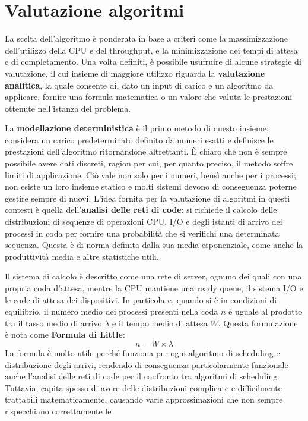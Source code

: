 \section{Valutazione algoritmi}
La scelta dell'algoritmo è ponderata in base a criteri come la massimizzazione dell'utilizzo della CPU e del throughput, e la minimizzazione dei tempi
di attesa e di completamento. Una volta definiti, è possibile usufruire di alcune strategie di valutazione, il cui insieme di maggiore utilizzo
riguarda la \textbf{valutazione analitica}, la quale consente di, dato un input di carico e un algoritmo da applicare, fornire una formula matematica o
un valore che valuta le prestazioni ottenute nell'istanza del problema.\par
La \textbf{modellazione deterministica} è il primo metodo di questo insieme; considera un carico predeterminato definito da numeri esatti e definisce
le prestazioni dell'algoritmo ritornandone altrettanti. È chiaro che non è sempre possibile avere dati discreti, ragion per cui, per quanto
preciso, il metodo soffre limiti di applicazione. Ciò vale non solo per i numeri, bensì anche per i processi; non esiste un loro insieme statico e
molti sistemi devono di conseguenza poterne gestire sempre di nuovi. L'idea fornita per la valutazione di algoritmi in questi contesti è quella
dell'\textbf{analisi delle reti di code}: si richiede il calcolo delle distribuzioni di sequenze di operazioni CPU, I/O e degli istanti di arrivo dei
processi in coda per fornire una probabilità che si verifichi una determinata sequenza. Questa è di norma definita dalla sua media esponenziale, come
anche la produttività media e altre statistiche utili.\par
Il sistema di calcolo è descritto come una rete di server, ognuno dei quali con una propria coda d'attesa, mentre la CPU mantiene una ready queue, il
sistema I/O e le code di attesa dei dispositivi. In particolare, quando si è in condizioni di equilibrio, il numero medio dei processi presenti nella
coda $n$ è uguale al prodotto tra il tasso medio di arrivo $\lambda$ e il tempo medio di attesa $W$. Questa formulazione è nota come \textbf{Formula di
Little}: \[
    n = W\times\lambda
\]
\noindent La formula è molto utile perché funziona per ogni algoritmo di scheduling e distribuzione degli arrivi, rendendo di conseguenza
particolarmente funzionale anche l'analisi delle reti di code per il confronto tra algoritmi di scheduling. Tuttavia, capita spesso di avere delle
distribuzioni complicate e difficilmente trattabili matematicamente, causando varie approssimazioni che non sempre rispecchiano correttamente le
